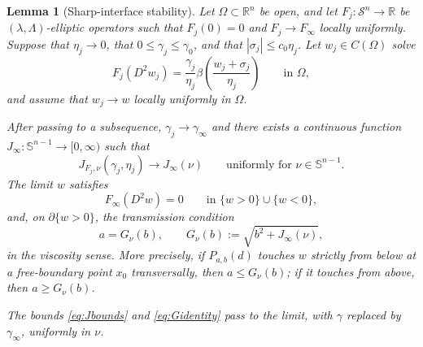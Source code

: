 \documentclass[11pt,letterpaper]{amsart}
\numberwithin{equation}{section}
\newcommand{\Sn}{\mathcal S^n}
\newtheorem{lemma}[theorem]{Lemma}
\theoremstyle{definition}
\theoremstyle{remark}
\begin{document}
\begin{lemma}[Sharp-interface stability]\label{lem:sharp-stability}
Let $\Omega\subset\mathbb R^n$ be open, and let
$F_j:\Sn\to\mathbb R$ be $(\lambda,\Lambda)$-elliptic operators such that
$F_j(0)=0$ and $F_j\to F_\infty$ locally uniformly. Suppose that
$\eta_j\to0$, that $0\leq\gamma_j\leq\gamma_0$, and that
$|\sigma_j|\leq c_0\eta_j$. Let $w_j\in C(\Omega)$ solve
\begin{equation}\label{eq:collapsing-layer-sequence}
F_j(D^2w_j)
=
\frac{\gamma_j}{\eta_j}
\beta\left(\frac{w_j+\sigma_j}{\eta_j}\right)
\qquad\text{in }\Omega,
\end{equation}
and assume that $w_j\to w$ locally uniformly in $\Omega$.

After passing to a subsequence, $\gamma_j\to\gamma_\infty$ and there exists
a continuous function
$J_\infty:\mathbb S^{n-1}\to[0,\infty)$ such that
\begin{equation}\label{eq:J-uniform-limit}
J_{F_j,\nu}(\gamma_j,\eta_j)
\longrightarrow
J_\infty(\nu)
\qquad\text{uniformly for }\nu\in\mathbb S^{n-1}.
\end{equation}
The limit $w$ satisfies
$$
F_\infty(D^2w)=0
\qquad\text{in }\{w>0\}\cup\{w<0\},
$$
and, on $\partial\{w>0\}$, the transmission condition
\begin{equation}\label{eq:sharp-law}
a
=
G_\nu(b),
\qquad
G_\nu(b)
:=
\sqrt{b^2+J_\infty(\nu)},
\end{equation}
in the viscosity sense. More precisely, if $P_{a,b}(d)$ touches $w$ strictly
from below at a free-boundary point $x_0$ transversally, then
$a\leq G_\nu(b)$; if it touches from above, then
$a\geq G_\nu(b)$.

The bounds \eqref{eq:Jbounds} and \eqref{eq:Gidentity} pass to the limit,
with $\gamma$ replaced by $\gamma_\infty$, uniformly in $\nu$.
\end{lemma}
\end{document}
